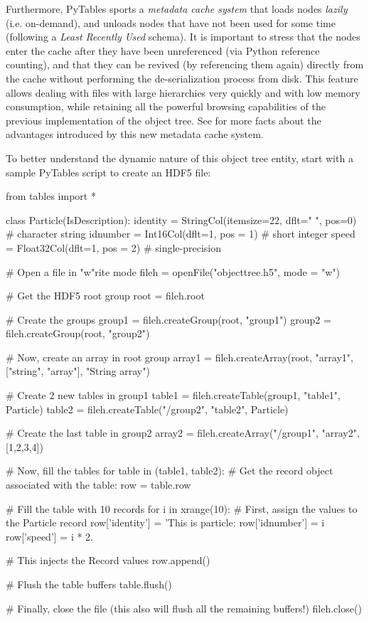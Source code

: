 Furthermore, PyTables sports a \emph{metadata
cache system} that loads nodes \emph{lazily}
(i.e. on-demand), and unloads nodes that have not been used for some
time (following a \emph{Least Recently Used} schema). It
is important to stress that the nodes enter the cache after they
have been unreferenced (via Python reference counting),
and that they can be revived (by referencing them again) directly from
the cache without performing the de-serialization process from
disk. This feature allows dealing with files with large hierarchies
very quickly and with low memory consumption, while retaining all the
powerful browsing capabilities of the previous implementation of the
object tree. See \cite{Alted2005} for
more facts about the advantages introduced by this new metadata cache
system.

To better understand the dynamic nature of this object tree
entity, start with a sample PyTables script to create an HDF5
file:

\vspace{2.5mm}
\begin{python}
from tables import *

class Particle(IsDescription):
    identity = StringCol(itemsize=22, dflt=" ", pos=0)  # character string
    idnumber = Int16Col(dflt=1, pos = 1)  # short integer
    speed    = Float32Col(dflt=1, pos = 2)  # single-precision

# Open a file in "w"rite mode
fileh = openFile("objecttree.h5", mode = "w")

# Get the HDF5 root group
root = fileh.root

# Create the groups
group1 = fileh.createGroup(root, "group1")
group2 = fileh.createGroup(root, "group2")

# Now, create an array in root group
array1 = fileh.createArray(root, "array1", ["string", "array"], "String array")

# Create 2 new tables in group1
table1 = fileh.createTable(group1, "table1", Particle)
table2 = fileh.createTable("/group2", "table2", Particle)

# Create the last table in group2
array2 = fileh.createArray("/group1", "array2", [1,2,3,4])

# Now, fill the tables
for table in (table1, table2):
    # Get the record object associated with the table:
    row = table.row

    # Fill the table with 10 records
    for i in xrange(10):
        # First, assign the values to the Particle record
        row['identity']  = 'This is particle: %
        row['idnumber'] = i
        row['speed']  = i * 2.

        # This injects the Record values
        row.append()

    # Flush the table buffers
    table.flush()

# Finally, close the file (this also will flush all the remaining buffers!)
fileh.close()
\end{python}
\vspace{2.5mm}

